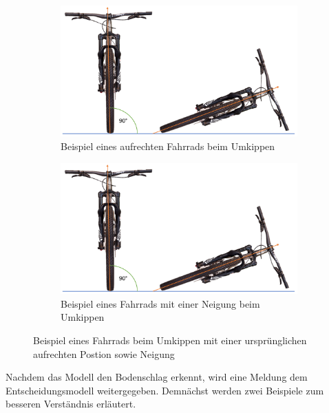 \begin{figure}[H]
	\centering
	\begin{subfigure}{0.49\textwidth}
		\centering
		\includegraphics[page = 1, width=\textwidth]{Bilder/BicycleGroundHit2Angles.pdf}
		\caption{Beispiel eines aufrechten Fahrrads beim Umkippen}
		\label{fig:BicycleGroundHit2Angles1}
	\end{subfigure}
	\begin{subfigure}{0.49\textwidth}
		\centering
		\includegraphics[page = 2, width=\textwidth]{Bilder/BicycleGroundHit2Angles.pdf}
		\caption{Beispiel eines Fahrrads mit einer Neigung beim Umkippen}
		\label{fig:BicycleGroundHit2Angles2}
	\end{subfigure}
	\caption{Beispiel eines Fahrrads beim Umkippen mit einer ursprünglichen aufrechten Postion sowie Neigung}
	\label{fig:BicycleGroundHit2Angles}
\end{figure}

Nachdem das Modell den Bodenschlag erkennt, wird eine Meldung dem Entscheidungsmodell weitergegeben. Demnächst werden zwei Beispiele zum besseren Verständnis erläutert.

